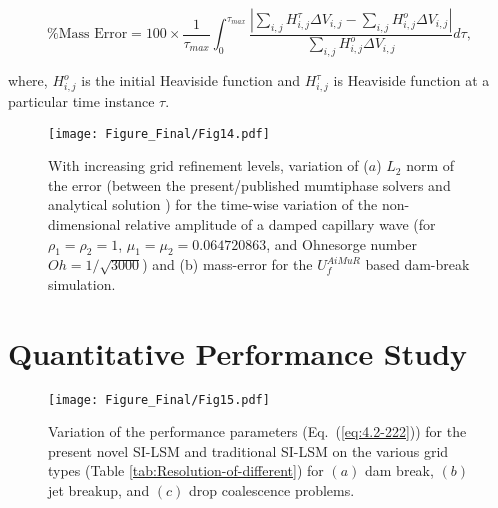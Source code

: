 \documentclass[preprint,12pt]{elsarticle}
\newcommand{\review}[1]{\color{black}#1}
\begin{document}
{\begin{equation}
 \text{\% Mass Error} = 100\times\frac{1}{\tau_{max}}\int_{0}^{\tau_{max}}\frac{\left | \sum_{i,j}H_{i,j}^{\tau}\Delta V_{i,j}-\sum_{i,j}H_{i,j}^{o}\Delta V_{i,j} \right |}{\sum_{i,j}H_{i,j}^{o}\Delta V_{i,j}}d\tau, 
 \end{equation}
 
\noindent where, $H_{i,j}^{o}$ is the initial Heaviside function and $H_{i,j}^{\tau}$ is Heaviside function at a particular time instance $\tau$.




\begin{figure}

\begin{centering}
\texttt{[image: Figure\_Final/Fig14.pdf]}
\par\end{centering}

\protect\caption{\label{fig:order_of_accuracy1}\review{
With increasing grid refinement levels, variation of ($a$) $L_{2}$ norm of the error (between the present/published mumtiphase solvers and analytical solution \cite{prosperetti1981}) for the time-wise variation of the non-dimensional relative amplitude of a damped capillary wave (for $\rho_{1}=\rho_{2}=1$, $\mu_{1}=\mu_{2}=0.064720863$, and Ohnesorge number $Oh=1/\sqrt{3000}$) and (b) mass-error for the $U_{f}^{AiMuR}$  based dam-break simulation.}}

\end{figure}




}

\section{Quantitative Performance Study}\label{sec:performance}



\begin{figure}
\begin{centering}

\par\end{centering}

\begin{centering}
\texttt{[image: Figure\_Final/Fig15.pdf]}
\par\end{centering}

\protect\caption{\label{fig:Performance-curve-for}Variation of the performance parameters (Eq.~(\ref{eq:4.2-222})) for the present novel SI-LSM and traditional SI-LSM on the various grid types (Table \ref{tab:Resolution-of-different}) for $(a)$ dam break, $(b)$ jet breakup, and $(c)$ drop coalescence
problems.} 
\end{figure}
\end{document}
